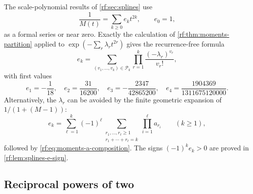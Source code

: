 \documentclass[11pt,oneside]{article}
\theoremstyle{plain}
\theoremstyle{definition}
\theoremstyle{remark}
\newcommand{\Prof}[1]{\mathcal{P}_{#1}}     %
\begin{document}
The scale-polynomial results of \cref{rf:sec:splines} use
\begin{equation}
 \frac{1}{M(t)}=\sum_{k\ge0}e_{k}t^{2k},\qquad e_{0}=1,
 \label{rf:eq:moments-inverse-M}
\end{equation}
as a formal series or near zero.  Exactly the calculation of
\cref{rf:thm:moments-partition} applied to $\exp(-\sum_{r}\lambda_{r}t^{2r})$
gives the recurrence-free formula
\begin{equation}
 e_{k}=\sum_{(v_{1},\ldots,v_{k})\in\Prof{k}}
       \prod_{r=1}^{k}\frac{(-\lambda_{r})^{v_{r}}}{v_{r}!},
 \label{rf:eq:moments-e-partition}
\end{equation}
with first values
\begin{equation}
 e_{1}=-\frac{1}{18},\quad e_{2}=\frac{31}{16200},\quad
 e_{3}=-\frac{2347}{42865200},\quad e_{4}=\frac{1904369}{1311675120000}.
 \label{rf:eq:moments-e-values}
\end{equation}
Alternatively, the $\lambda_{r}$ can be avoided by the finite geometric
expansion of $1/(1+(M-1))$:
\begin{equation}
 e_{k}=\sum_{\ell=1}^{k}(-1)^{\ell}
 \sum_{\substack{r_{1},\ldots,r_{\ell}\ge1\\ r_{1}+\cdots+r_{\ell}=k}}
 \prod_{i=1}^{\ell}a_{r_{i}}\qquad(k\ge1),
 \label{rf:eq:moments-e-compositions}
\end{equation}
followed by \cref{rf:eq:moments-a-composition}.  The signs $(-1)^{k}e_{k}>0$
are proved in \cref{rf:lem:splines-e-sign}.

\subsection{Reciprocal powers of two}
\label{rf:sec:moments-reciprocal-powers}
\end{document}
